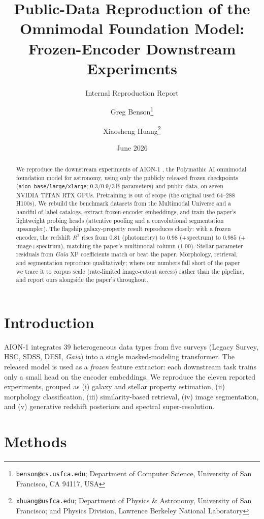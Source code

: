 \documentclass[11pt,letterpaper]{article}
\title{Public-Data Reproduction of the \aion{} Omnimodal Foundation Model:\\
       Frozen-Encoder Downstream Experiments}
\author{Greg Benson\thanks{\texttt{benson@cs.usfca.edu}; Department of Computer
        Science, University of San Francisco, CA 94117, USA} \and
        Xiaosheng Huang\thanks{\texttt{xhuang@usfca.edu}; Department of Physics
        \& Astronomy, University of San Francisco; and Physics Division,
        Lawrence Berkeley National Laboratory}}
\date{June 2026}
\newcommand{\aion}{\textsc{AION-1}}
\newcommand{\Rsq}{\ensuremath{R^{2}}}
\begin{document}
\maketitle
\subtitle{Internal Reproduction Report}

\begin{abstract}
We reproduce the downstream experiments of \aion{} \citep{parker2025aion}, the
Polymathic AI omnimodal foundation model for astronomy, using only the publicly
released frozen checkpoints (\texttt{aion-base/large/xlarge}; 0.3/0.9/3\,B
parameters) and public data, on seven NVIDIA TITAN RTX GPUs. Pretraining is out
of scope (the original used 64--288 H100s). We rebuild the benchmark datasets
from the Multimodal Universe \citep{mmu2024} and a handful of label catalogs,
extract frozen-encoder embeddings, and train the paper's lightweight probing
heads (attentive pooling and a convolutional segmentation upsampler). The
flagship galaxy-property result reproduces closely: with a frozen encoder, the
redshift \Rsq{} rises from $0.81$ (photometry) to $0.98$ ($+$spectrum) to
$0.985$ ($+$image$+$spectrum), matching the paper's multimodal column
($1.00$). Stellar-parameter residuals from \textit{Gaia} XP coefficients
match or beat the paper. Morphology, retrieval, and segmentation reproduce
qualitatively; where our numbers fall short of the paper we trace it to corpus
scale (rate-limited image-cutout access) rather than the pipeline, and report
ours alongside the paper's throughout.
\end{abstract}

\section{Introduction}
\aion{} integrates 39 heterogeneous data types from five surveys (Legacy
Survey, HSC, SDSS, DESI, \textit{Gaia}) into a single masked-modeling
transformer. The released model is used as a \emph{frozen} feature extractor:
each downstream task trains only a small head on the encoder embeddings. We
reproduce the eleven reported experiments, grouped as (i) galaxy and stellar
property estimation, (ii) morphology classification, (iii) similarity-based
retrieval, (iv) image segmentation, and (v) generative redshift posteriors and
spectral super-resolution.

\section{Methods}
\end{document}
